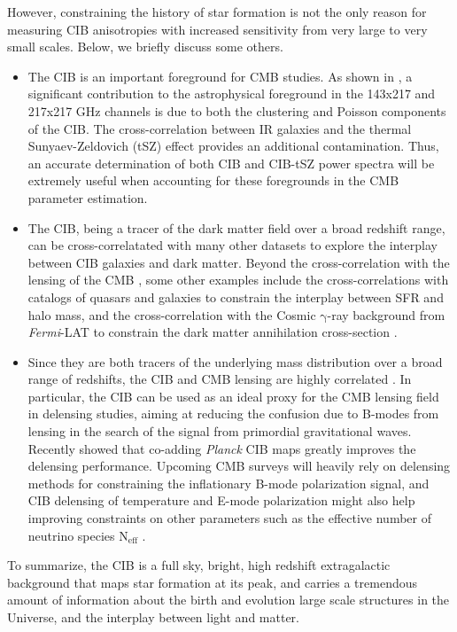 However, constraining the history of star formation is not the only reason for
measuring CIB anisotropies with increased sensitivity
from very large to very small scales. Below, we briefly discuss some others.
\begin{itemize}
\item The CIB is an important foreground for CMB studies. As shown in
\cite{planck2016like}, a significant contribution to the
astrophysical foreground in the 143x217 and 217x217 GHz channels is
due to both the clustering and Poisson components of the CIB.
The cross-correlation between IR galaxies and the thermal
Sunyaev-Zeldovich (tSZ) effect provides an additional contamination.
Thus, an accurate determination of both CIB and CIB-tSZ power
spectra will be extremely useful when accounting for these foregrounds
in the CMB parameter estimation.
\item The CIB, being a tracer of the dark matter field over a broad redshift range,
can be cross-correlatated with many other datasets to explore
the interplay between CIB galaxies and dark matter. Beyond the
cross-correlation with the lensing of the CMB
\citep{planckXVIII,holder2013}, some other examples include the cross-correlations
with catalogs of quasars \citep{wang2015} and
galaxies \citep{serra2014} to constrain the interplay between
SFR and halo mass, and the cross-correlation with the Cosmic
$\mathrm{\gamma}$-ray background from {\it Fermi}-LAT
\citep{fermi2016} to constrain the dark matter annihilation
cross-section \citep{cooray2016}.
\item Since they are both tracers of the underlying mass distribution over
a broad range of redshifts, the CIB and CMB lensing are highly correlated
\citep{planckXVIII}. In particular, the CIB can be used as
an ideal proxy for the CMB lensing field in delensing studies, aiming at
reducing the confusion due to B-modes from lensing in the search of the
signal from primordial gravitational waves.
Recently \cite{sherwin2015,larsen2016} showed that co-adding {\it Planck} CIB maps
greatly improves the delensing performance. Upcoming CMB surveys
will heavily rely on delensing methods for constraining the
inflationary B-mode polarization signal, and CIB delensing of temperature and E-mode
polarization might also help improving constraints on other parameters such as the effective
number of neutrino species $\mathrm{N_{eff}}$ \citep{larsen2016}.
\end{itemize}
To summarize, the CIB is a full sky, bright, high redshift extragalactic
background that maps star formation at its peak, and carries
a tremendous amount of information about the birth and
evolution large scale structures in the Universe, and the interplay
between light and matter.


